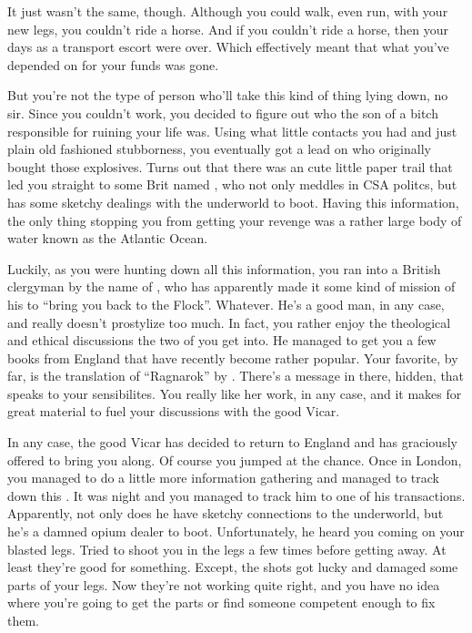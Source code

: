 \documentclass[char]{airship}
\begin{document}
It just wasn't the same, though.  Although you could walk, even run,
with your new legs, you couldn't ride a horse.  And if you couldn't
ride a horse, then your days as a transport escort were over.  Which
effectively meant that what you've depended on for your funds was
gone.

But you're not the type of person who'll take this kind of thing lying
down, no sir.  Since you couldn't work, you decided to figure out who
the son of a bitch responsible for ruining your life was.  Using what
little contacts you had and just plain old fashioned stubborness, you
eventually got a lead on who originally bought those explosives.
Turns out that there was an cute little paper trail that led you
straight to some Brit named \cDealer{\intro}, who not only meddles in CSA
politcs, but has some sketchy dealings with the underworld to boot.
Having this information, the only thing stopping you from getting your
revenge was a rather large body of water known as the Atlantic Ocean.

Luckily, as you were hunting down all this information, you ran into a
British clergyman by the name of \cVicar{\intro}, who has apparently made
it some kind of mission of his to ``bring you back to the Flock''.
Whatever.  He's a good man, in any case, and really doesn't prostylize
too much.  In fact, you rather enjoy the theological and ethical
discussions the two of you get into.  He managed to get you a few
books from England that have recently become rather popular.  Your
favorite, by far, is the translation of ``Ragnarok'' by
\cSaboteur{\intro}.  There's a message in there, hidden, that speaks to
your sensibilites.  You really like her work, in any case, and it
makes for great material to fuel your discussions with the good Vicar.

In any case, the good Vicar has decided to return to England and has
graciously offered to bring you along.  Of course you jumped at the
chance.  Once in London, you managed to do a little more information
gathering and managed to track down this {\cDealer{}}.  It was night
and you managed to track him to one of his transactions.  Apparently,
not only does he have sketchy connections to the underworld, but he's
a damned opium dealer to boot.  Unfortunately, he heard you coming on
your blasted legs.  Tried to shoot you in the legs a few times before
getting away.  At least they're good for something.  Except, the shots
got lucky and damaged some parts of your legs.  Now they're not
working quite right, and you have no idea where you're going to get
the parts or find someone competent enough to fix them.
\end{document}
